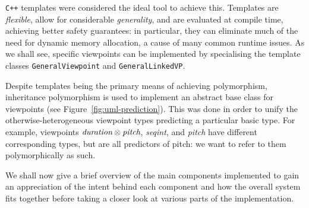 \documentclass[12pt,a4paper,twoside,openright]{report}
\begin{document}
\texttt{C++} templates were considered the ideal tool to achieve this. Templates
are \emph{flexible}, allow for considerable \emph{generality}, and are evaluated
at compile time, achieving better safety guarantees: in particular, they can
eliminate much of the need for dynamic memory allocation, a cause of many common
runtime issues. As we shall see, specific viewpoints can be implemented by
specialising the template classes \texttt{GeneralViewpoint} and
\texttt{GeneralLinkedVP}. 

Despite templates being the primary means of achieving polymorphism, inheritance
polymorphism is used to implement an abstract base class for viewpoints (see
Figure~\ref{fig:uml-prediction}). This was done in order to unify the
otherwise-heterogeneous viewpoint types predicting a particular basic type. For
example, viewpoints $\emph{duration} \otimes \emph{pitch}$, \emph{seqint}, and
\emph{pitch} have different corresponding types, but are all predictors of
pitch: we want to refer to them polymorphically as such.

We shall now give a brief overview of the main components implemented to gain an
appreciation of the intent behind each component and how the overall system fits
together before taking a closer look at various parts of the implementation.
\end{document}
